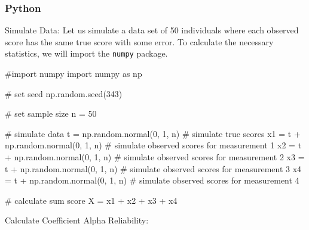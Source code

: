 \documentclass[
  letterpaper,
  DIV=11,
  numbers=noendperiod]{scrreprt}
\newenvironment{Shaded}{\begin{snugshade}}{\end{snugshade}}
\newcommand{\CommentTok}[1]{\textcolor[rgb]{0.37,0.37,0.37}{#1}}
\newcommand{\DecValTok}[1]{\textcolor[rgb]{0.68,0.00,0.00}{#1}}
\newcommand{\ImportTok}[1]{\textcolor[rgb]{0.00,0.46,0.62}{#1}}
\newcommand{\NormalTok}[1]{\textcolor[rgb]{0.00,0.23,0.31}{#1}}
\newcommand{\OperatorTok}[1]{\textcolor[rgb]{0.37,0.37,0.37}{#1}}
\begin{document}
\subsubsection{Python}

Simulate Data: Let us simulate a data set of 50 individuals where each
observed score has the same true score with some error. To calculate the
necessary statistics, we will import the \texttt{numpy} package.

\begin{Shaded}
\begin{Highlighting}[]
\CommentTok{\#import numpy}
\ImportTok{import}\NormalTok{ numpy }\ImportTok{as}\NormalTok{ np}

\CommentTok{\# set seed}
\NormalTok{np.random.seed(}\DecValTok{343}\NormalTok{)}

\CommentTok{\# set sample size}
\NormalTok{n }\OperatorTok{=} \DecValTok{50}

\CommentTok{\# simulate data}
\NormalTok{t }\OperatorTok{=}\NormalTok{ np.random.normal(}\DecValTok{0}\NormalTok{, }\DecValTok{1}\NormalTok{, n) }\CommentTok{\# simulate true scores}
\NormalTok{x1 }\OperatorTok{=}\NormalTok{ t }\OperatorTok{+}\NormalTok{ np.random.normal(}\DecValTok{0}\NormalTok{, }\DecValTok{1}\NormalTok{, n) }\CommentTok{\# simulate observed scores for measurement 1}
\NormalTok{x2 }\OperatorTok{=}\NormalTok{ t }\OperatorTok{+}\NormalTok{ np.random.normal(}\DecValTok{0}\NormalTok{, }\DecValTok{1}\NormalTok{, n) }\CommentTok{\# simulate observed scores for measurement 2}
\NormalTok{x3 }\OperatorTok{=}\NormalTok{ t }\OperatorTok{+}\NormalTok{ np.random.normal(}\DecValTok{0}\NormalTok{, }\DecValTok{1}\NormalTok{, n) }\CommentTok{\# simulate observed scores for measurement 3}
\NormalTok{x4 }\OperatorTok{=}\NormalTok{ t }\OperatorTok{+}\NormalTok{ np.random.normal(}\DecValTok{0}\NormalTok{, }\DecValTok{1}\NormalTok{, n) }\CommentTok{\# simulate observed scores for measurement 4}

\CommentTok{\# calculate sum score}
\NormalTok{X }\OperatorTok{=}\NormalTok{ x1 }\OperatorTok{+}\NormalTok{ x2 }\OperatorTok{+}\NormalTok{ x3 }\OperatorTok{+}\NormalTok{ x4}
\end{Highlighting}
\end{Shaded}

Calculate Coefficient Alpha Reliability:
\end{document}
